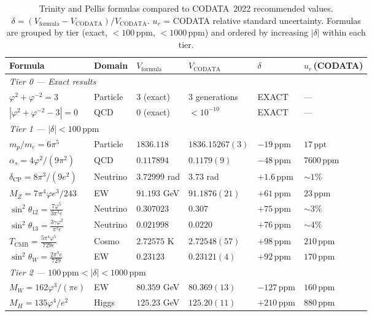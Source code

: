 \documentclass[11pt,a4paper]{article}
\newcommand{\vp}{\varphi}
\newcommand{\CODATA}{\text{CODATA}}
\newcommand{\ppm}{\,\mathrm{ppm}}
\newcommand{\ppt}{\,\mathrm{ppt}}
\begin{document}
\begin{table}[H]
\centering
\caption{Trinity and Pellis formulas compared to CODATA~2022 recommended
  values. $\delta = (V_{\mathrm{formula}} - V_{\CODATA})/V_{\CODATA}$.
  $u_r$ = CODATA relative standard uncertainty. Formulas are grouped by
  tier (exact, $<100\ppm$, $<1000\ppm$) and ordered by increasing
  $|\delta|$ within each tier.}
\label{tab:results}
\small
\begin{tabular}{@{}p{4.2cm}lllll@{}}
\toprule
Formula & Domain & $V_{\mathrm{formula}}$ & $V_{\CODATA}$ & $\delta$ & $u_r$\,(CODATA) \\
\midrule
\multicolumn{6}{l}{\textit{Tier 0 --- Exact results}} \\[3pt]
$\vp^{2}+\vp^{-2}=3$ & Particle & 3 (exact) & 3 generations & EXACT & --- \\
$|\vp^{2}+\vp^{-2}-3|=0$ & QCD & 0 (exact) & $<10^{-10}$ & EXACT & --- \\
\midrule
\multicolumn{6}{l}{\textit{Tier 1 --- $|\delta|<100\ppm$}} \\[3pt]
$m_p/m_e=6\pi^{5}$ & Particle & $1836.118$ & $1836.15267(3)$ & $-19\ppm$ & $17\ppt$ \\
$\alpha_s=4\vp^{2}/(9\pi^{2})$ & QCD & $0.117894$ & $0.1179(9)$ & $-48\ppm$ & $7600\ppm$ \\
$\delta_{\mathrm{CP}}=8\pi^{3}/(9e^{2})$ & Neutrino & $3.72999$ rad & $3.73$ rad & $+1.6\ppm$ & $\sim 1\%$ \\
$M_Z=7\pi^{4}\vp e^{3}/243$ & EW & $91.193$ GeV & $91.1876(21)$ & $+61\ppm$ & $23\ppm$ \\
$\sin^{2}\!\theta_{12}=\frac{7\vp^{5}}{3\pi^{3}e}$ & Neutrino & $0.307023$ & $0.307$ & $+75\ppm$ & $\sim 3\%$ \\
$\sin^{2}\!\theta_{13}=\frac{3\gamma\vp^{2}}{\pi^{3}e}$ & Neutrino & $0.021998$ & $0.0220$ & $+76\ppm$ & $\sim 4\%$ \\
$T_{\mathrm{CMB}}=\frac{5\pi^{4}\vp^{5}}{729e}$ & Cosmo & $2.72575$ K & $2.72548(57)$ & $+98\ppm$ & $210\ppm$ \\
$\sin^{2}\!\theta_W=\frac{2\pi^{3}e}{729}$ & EW & $0.23123$ & $0.23121(4)$ & $+92\ppm$ & $170\ppm$ \\
\midrule
\multicolumn{6}{l}{\textit{Tier 2 --- $100\ppm < |\delta| < 1000\ppm$}} \\[3pt]
$M_W=162\vp^{3}/(\pi e)$ & EW & $80.359$ GeV & $80.369(13)$ & $-127\ppm$ & $160\ppm$ \\
$M_H=135\vp^{4}/e^{2}$ & Higgs & $125.23$ GeV & $125.20(11)$ & $+210\ppm$ & $880\ppm$ \\

\end{tabular}
\end{table}
\end{document}
